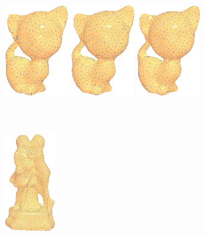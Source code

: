 \begin{figure}[htbp]
\centering
\includegraphics[width=0.25\textwidth]{figs/cvt/wireframe_GXH_kitten_seed1000.png}
\includegraphics[width=0.25\textwidth]{figs/cvt/wireframe_LIUYANG_kitten_seed1000.png}
\includegraphics[width=0.25\textwidth]{figs/cvt/wireframe_OURS_kitten_seed1000_v2.png}\\
\\
   \\
\\
\includegraphics[width=0.2\textwidth]{figs/cvt/wireframe_Sculpture_GXH.png}

\end{figure}
